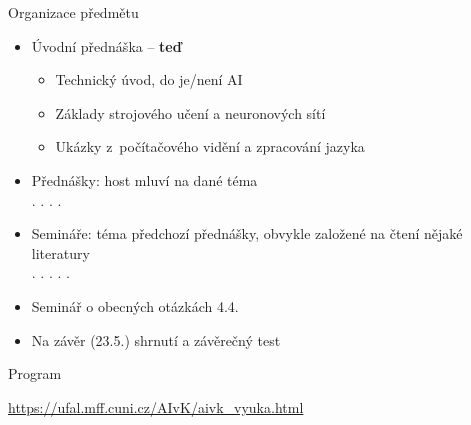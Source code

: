 \begin{frame}{Organizace předmětu}

    \begin{itemize}[<+->]

        \item Úvodní přednáška -- \textbf{teď}

        \begin{itemize}[<+->]

            \item Technický úvod, do je/není AI

            \item Základy strojového učení a neuronových sítí

            \item Ukázky z~počítačového vidění a zpracování jazyka

        \end{itemize}

        \item Přednášky: host mluví na dané téma \\
            . . .  .


        \item Semináře: téma předchozí přednášky, obvykle založené na čtení
            nějaké literatury \\
            . . . . .

		\item Seminář o obecných otázkách 4.4.

        \item Na závěr (23.5.) shrnutí a závěrečný test

    \end{itemize}

    \vspace{10pt}

    \centering

\end{frame}


\begin{frame}{Program}

    \large\centering\url{https://ufal.mff.cuni.cz/AIvK/aivk_vyuka.html}


\end{frame}

